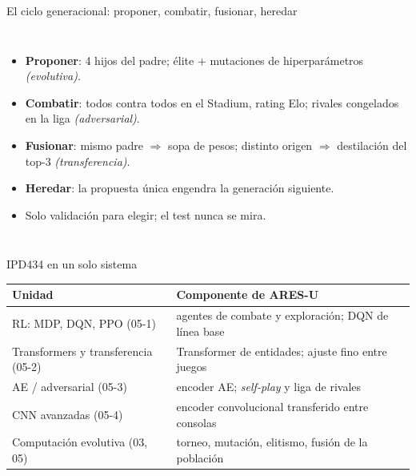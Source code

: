 \documentclass[aspectratio=169,11pt]{beamer}
\begin{document}
\begin{frame}{El ciclo generacional: proponer, combatir, fusionar, heredar}
\begin{columns}[T]
\centering
{}
\small
\begin{itemize}
\item \textbf{Proponer}: 4 hijos del padre; élite + mutaciones de hiperparámetros \emph{(evolutiva)}.
\item \textbf{Combatir}: todos contra todos en el Stadium, rating Elo; rivales congelados en la liga \emph{(adversarial)}.
\item \textbf{Fusionar}: mismo padre $\Rightarrow$ sopa de pesos; distinto origen $\Rightarrow$ destilación del top-3 \emph{(transferencia)}.
\item \textbf{Heredar}: la propuesta única engendra la generación siguiente.
\item Solo validación para elegir; el test nunca se mira.
\end{itemize}
\end{columns}
\end{frame}

\begin{frame}{IPD434 en un solo sistema}
\small\centering
\begin{tabular}{p{}p{}}
\toprule
Unidad & Componente de ARES-U \\
\midrule
RL: MDP, DQN, PPO (05-1) & agentes de combate y exploración; DQN de línea base \\
Transformers y transferencia (05-2) & Transformer de entidades; ajuste fino entre juegos \\
AE / adversarial (05-3) & encoder AE; \emph{self-play} y liga de rivales \\
CNN avanzadas (05-4) & encoder convolucional transferido entre consolas \\
Computación evolutiva (03, 05) & torneo, mutación, elitismo, fusión de la población \\
\bottomrule
\end{tabular}
\end{frame}
\end{document}
